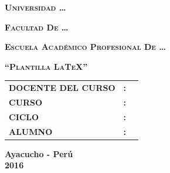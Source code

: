 	\begin{titlepage}
		\begin{center}
			{\huge \textsc{\textbf{Universidad \ldots}}}
			
			\medskip
			
			{\LARGE \textsc{\textbf{Facultad De \ldots}}}
			
			\medskip
			
			{\Large \textsc{\textbf{Escuela Académico Profesional De \ldots}}}
			
			\vspace{\fill}
			
			\begin{figure}[tbph!]
				\centering
			\end{figure}
			
			\vspace{\fill}
			
			{\Large \textsc{\textbf{``Plantilla \LaTeX''}}}
		\end{center}
		
		\vspace{\fill}
		
		\begin{tabular}{llp{19em}}
			\textbf{DOCENTE DEL CURSO} & \textbf{:} & {} \\
			\textbf{CURSO}             & \textbf{:} & {} \\
			\textbf{CICLO}             & \textbf{:} & {} \\
			\textbf{ALUMNO}            & \textbf{:} & {} \\
		\end{tabular}
		
		\vspace{\fill}
		
		\begin{center}
			{\Large \textbf{Ayacucho - Perú\\ 2016}}
		\end{center}
	\end{titlepage}
